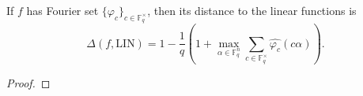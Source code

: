 \begin{theorem}
\label{lem:ff-distance-to-linearity}
\leanok
If $f$ has Fourier set $\{\varphi_c\}_{c \in \mathbb{F}_q^\times}$,
  then its distance to the linear functions is
  \[
    \Delta(f,\mathrm{LIN})
    = 1 - \frac{1}{q}\left(1 + \max_{\alpha \in \mathbb{F}_q^n}
      \sum_{c \in \mathbb{F}_q^\times} \widehat{\varphi_c}(c\alpha)\right).
  \]
\end{theorem}
\begin{proof}
\end{proof}
